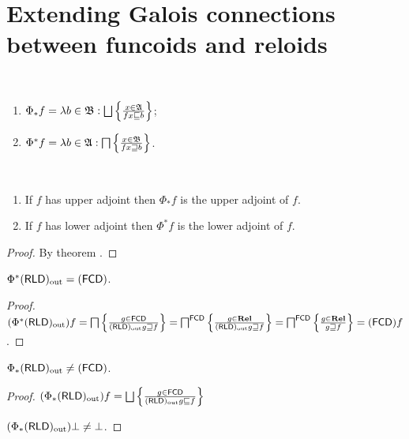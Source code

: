\chapter{Extending Galois connections between funcoids and reloids}

\begin{defn}
~
\begin{enumerate}
\item $\Phi_{\ast} f = \lambda b \in \mathfrak{B}: \bigsqcup \setcond{ x \in
\mathfrak{A} }{ f x \sqsubseteq b }$;
\item $\Phi^{\ast} f = \lambda b \in \mathfrak{A}: \bigsqcap \left\{ \frac{ x \in
\mathfrak{B} }{ f x \sqsupseteq b }\right\}$.
\end{enumerate}
\end{defn}

\begin{prop}
  ~
  \begin{enumerate}
    \item If $f$ has upper adjoint then $\Phi_{\ast} f$ is the upper adjoint
    of $f$.
    
    \item If $f$ has lower adjoint then $\Phi^{\ast} f$ is the lower adjoint
    of $f$.
  \end{enumerate}
\end{prop}

\begin{proof}
  By theorem .
\end{proof}

\begin{lem}
  $\Phi^{\ast} (\mathsf{RLD})_{\mathrm{out}} = (\mathsf{FCD})$.
\end{lem}

\begin{proof}
  $(\Phi^{\ast} (\mathsf{RLD})_{\mathrm{out}}) f = \bigsqcap \left\{ \frac{ g
  \in \mathsf{FCD} }{
 (\mathsf{RLD})_{\mathrm{out}} g \sqsupseteq f }\right\} =
  \bigsqcap^{\mathsf{FCD}} \left\{ \frac{ g \in \mathbf{Rel}
  }{ (\mathsf{RLD})_{\mathrm{out}} g \sqsupseteq
  f }\right\} = \bigsqcap^{\mathsf{FCD}} \left\{ \frac{ g \in
  \mathbf{Rel} }{ g \sqsupseteq f }\right\} =
  (\mathsf{FCD}) f$.
\end{proof}

\begin{lem}
  $\Phi_{\ast} (\mathsf{RLD})_{\mathrm{out}} \neq
  (\mathsf{FCD})$.
\end{lem}

\begin{proof}
  $(\Phi_{\ast} \torldout) f = \bigsqcup \setcond{ g
  \in \mathsf{FCD} }{
 \torldout g \sqsubseteq f }$
  
  $(\Phi_{\ast} (\mathsf{RLD})_{\mathrm{out}}) \bot \neq \bot$.
\end{proof}


